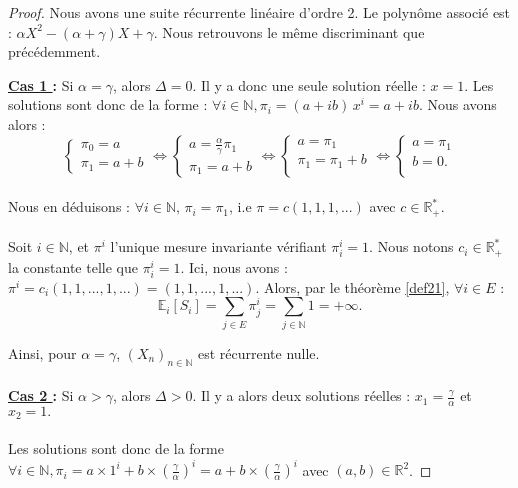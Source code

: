 \documentclass[12pt,a4paper]{report}
\theoremstyle{remark}
\begin{document}
\begin{proof}
Nous avons une suite récurrente linéaire d'ordre 2. Le polynôme associé est  : $\alpha X^2 -(\alpha+\gamma)X+\gamma$. Nous retrouvons le même discriminant que précédemment.

\vspace {0.5cm}
\textbf{\underline{Cas 1 } :} Si $\alpha = \gamma$, alors $\Delta = 0$. Il y a donc une seule solution réelle : $x =1.$
Les solutions sont donc de la forme : $\forall i \in \mathbb{N}, \pi_i = (a+ib) \, x^i = a+ib$. Nous avons alors : $$
\left\{
\begin{array}{ll}
        \pi_0 = a\\
        \pi_1 = a + b
    \end{array}
\right.
\iff \left\{
\begin{array}{ll}
        a = \frac{\alpha}{\gamma}\pi_1\\
        \pi_1 = a + b
    \end{array}
    \right.
\iff \left\{
\begin{array}{ll}
       a = \pi_1\\
       \pi_1 = \pi_1 + b\\
    \end{array}
    \right.
\iff \left\{
\begin{array}{ll}
       a = \pi_1\\
      b = 0 .\\
\end{array}
\right.
$$
\\
Nous en déduisons : $\forall i \in \mathbb{N}, \, \pi_i = \pi_1$, i.e $\pi = c (1,1,1,...)$ avec $c \in \mathbb{R}_+^*$.
\\
\\
Soit $i \in \mathbb{N}$, et $\pi^i$ l'unique mesure invariante vérifiant $\pi_i^i=1$. Nous notons $c_i\in \mathbb{R}_+^*$ la constante telle que $\pi_i^i=1$. Ici, nous avons : $\pi^i=c_i\left(1,1,...,1,...\right)=\left(1,1,...,1,...\right)$.
Alors, par le théorème \ref{def21}, $\forall i \in E$ :
$$\mathbb{E}_i[S_i]=\sum\limits_{j\in E }\pi_j^i = \sum\limits_{j\in\mathbb{N} }1 = +\infty.$$

Ainsi, pour $\alpha=\gamma$, $(X_n)_{n\in\mathbb{N}}$ est récurrente nulle.
\\
\\
\textbf{\underline{Cas 2 } :} Si $\alpha > \gamma$, alors $\Delta > 0$. Il y a alors deux solutions réelles : $x_1= \frac{\gamma}{\alpha}$ et $x_2=1.$
\\
\\
Les solutions sont donc de la forme $\forall i \in \mathbb {N}, \pi_i = a \times 1^i + b \times (\frac{\gamma}{\alpha})^i = a+b\times (\frac{\gamma}{\alpha})^i$ avec $ (a,b) \in \mathbb{R}^2$.


\end{proof}
\end{document}
